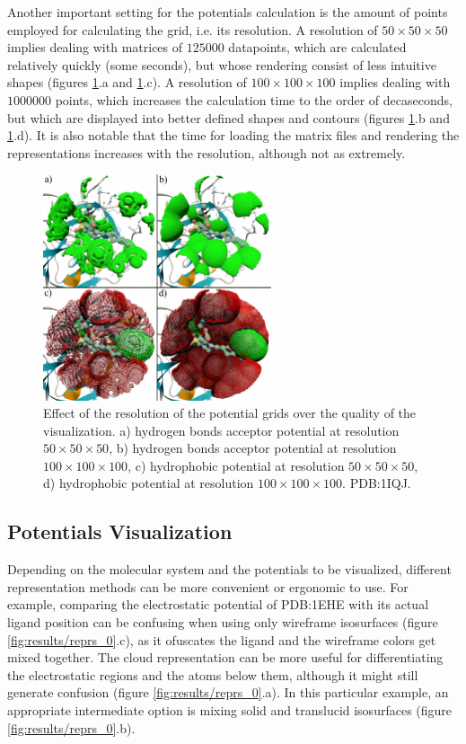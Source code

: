     Another important setting for the potentials calculation is the amount of points employed for calculating the grid, i.e. its resolution. A resolution of $50 \times 50 \times 50$ implies dealing with matrices of $125000$ datapoints, which are calculated relatively quickly (some seconds), but whose rendering consist of less intuitive shapes (figures \ref{fig:results/resolution}.a and \ref{fig:results/resolution}.c). A resolution of $100 \times 100 \times 100$ implies dealing with $1000000$ points, which increases the calculation time to the order of decaseconds, but which are displayed into better defined shapes and contours (figures \ref{fig:results/resolution}.b and \ref{fig:results/resolution}.d). It is also notable that the time for loading the matrix files and rendering the representations increases with the resolution, although not as extremely.

    \begin{figure}[H]
      \centering
      \includegraphics[width=0.6\textwidth]{figures/results/resolution.png}
      \caption{\label{fig:results/resolution} Effect of the resolution of the potential grids over the quality of the visualization. a) hydrogen bonds acceptor potential at resolution $50 \times 50 \times 50$, b) hydrogen bonds acceptor potential at resolution $100 \times 100 \times 100$, c) hydrophobic potential at resolution $50 \times 50 \times 50$, d) hydrophobic potential at resolution $100 \times 100 \times 100$. PDB:1IQJ.}
    \end{figure}

  \subsection{Potentials Visualization}
    Depending on the molecular system and the potentials to be visualized, different representation methods can be more convenient or ergonomic to use. For example, comparing the electrostatic potential of PDB:1EHE with its actual ligand position can be confusing when using only wireframe isosurfaces (figure \ref{fig:results/reprs_0}.c), as it ofuscates the ligand and the wireframe colors get mixed together. The cloud representation can be more useful for differentiating the electrostatic regions and the atoms below them, although it might still generate confusion (figure \ref{fig:results/reprs_0}.a). In this particular example, an appropriate intermediate option is mixing solid and translucid isosurfaces (figure \ref{fig:results/reprs_0}.b).

